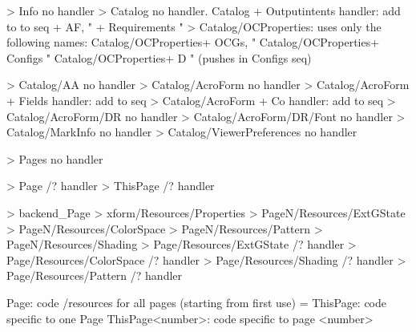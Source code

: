 >  {Info}                                 no handler
>  {Catalog}                              no handler.
   {Catalog}             + Outputintents  handler: add to to seq
                         + AF,             "
                         + Requirements    "
>  {Catalog/OCProperties}: uses only the following names:
   {Catalog/OCProperties}+ OCGs,           "
   {Catalog/OCProperties}+ Configs         "
   {Catalog/OCProperties}+ D               " (pushes in Configs seq)

>  {Catalog/AA}                            no handler
>  {Catalog/AcroForm}                      no handler
>  {Catalog/AcroForm}    + Fields          handler: add to seq
>  {Catalog/AcroForm}    + Co              handler: add to seq
>  {Catalog/AcroForm/DR}                   no handler
>  {Catalog/AcroForm/DR/Font}              no handler
>  {Catalog/MarkInfo}                      no handler
>  {Catalog/ViewerPreferences}             no handler

>  {Pages}                                 no handler

>  {Page}                                /? handler
>  {ThisPage}                            /? handler

>  {backend_Page}
>  {xform/Resources/Properties}
>  {PageN/Resources/ExtGState}
>  {PageN/Resources/ColorSpace}
>  {PageN/Resources/Pattern}
>  {PageN/Resources/Shading}
>  {Page/Resources/ExtGState}           /? handler
>  {Page/Resources/ColorSpace}          /? handler
>  {Page/Resources/Shading}             /? handler
>  {Page/Resources/Pattern}             /? handler



Page:             code /resources for all pages (starting from first use) = \pageattr
ThisPage:         code specific to one Page
ThisPage<number>: code specific to page <number>
